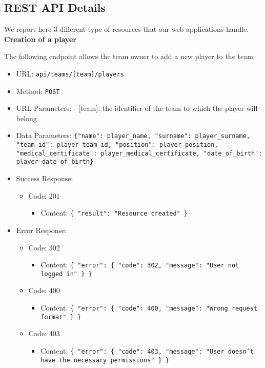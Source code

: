 \subsection{REST API Details}

We report here 3 different type of resources that our web applications handle.\\
\textbf{Creation of a player}

The following endpoint allows the team owner to add a new player to the team.
\begin{itemize}
    \item URL: \texttt{api/teams/[team]/players}
    \item Method: \texttt{POST}
    \item URL Parameters: - [team]: the identifier of the team to which the player will belong
    \item Data Parameters: \texttt{\{"name": player\_name, "surname": player\_surname, "team\_id": player\_team\_id, "position": player\_position, "medical\_certificate": player\_medical\_certificate, "date\_of\_birth": player\_date\_of\_birth\}}
    \item Success Response: 
    \begin{itemize}
        \item Code: 201 
            \begin{itemize}
                \item Content: \texttt{\{ "result": "Resource created" \}}
            \end{itemize}
    \end{itemize}
    \item Error Response:
    \begin{itemize}
        \item Code: 302
            \begin{itemize}
                \item Content: \texttt{\{ "error": \{ "code": 302, "message": "User not logged in" \} \}}
            \end{itemize}
        
        \item Code: 400
            \begin{itemize}
                \item Content: \texttt{\{ "error": \{ "code": 400, "message": "Wrong request format" \} \}}
            \end{itemize}
        
        \item Code: 403
            \begin{itemize}
                \item Content: \texttt{\{ "error": \{ "code": 403, "message": "User doesn't have the necessary permissions" \} \}}
            \end{itemize}
        

\end{itemize}
\end{itemize}
